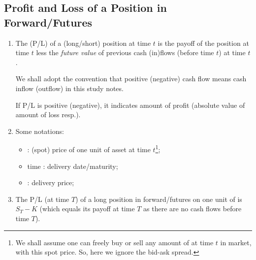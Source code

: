 \subsection{Profit and Loss of a Position in Forward/Futures}
\begin{enumerate}
\item The  (P/L) of a (long/short) position at time \(t\)
is the payoff of the position at time \(t\) less the \emph{future value} of
previous cash (in)flows (before time \(t\)) at time \(t\).

\begin{note}
We shall adopt the convention that positive (negative) cash flow means cash
inflow (outflow) in this study notes.
\end{note}
\begin{center}
\end{center}

\begin{note}
If P/L is positive (negative), it indicates amount of profit (absolute
value of amount of loss resp.).
\end{note}

\item Some notations:
\begin{itemize}
\item {}: (spot) price of one unit of asset  at
time \(t\)\footnote{We shall assume one can freely buy or sell any amount of
 at time \(t\) in market, with this spot price. So, here we
ignore the bid-ask spread.};
\item time : delivery date/maturity;
\item {}: delivery price;
\end{itemize}

\item \label{it:pl-long-fwd}
The P/L (at time \(T\)) of a long position in forward/futures on one unit of
 is \(S_T-K\) (which equals its payoff at time \(T\) as there
are no cash flows before time \(T\)).


\end{enumerate}
